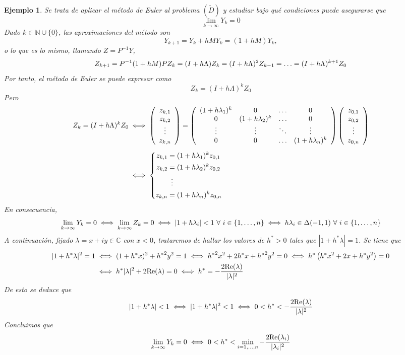 \documentclass[11pt]{report}
\theoremstyle{mytheorem}
\theoremstyle{mydefinition}
\theoremstyle{myexample}
\newtheorem*{example}{Ejemplo}
\newcommand{\N}{\mathbb N}
\newcommand{\C}{\mathbb C}
\begin{document}
\begin{example}
Se trata de aplicar el método de Euler al problema $(\widetilde{D})$ y estudiar bajo qué condiciones puede asegurarse que \[\lim_{k \to \infty} Y_k = 0\]
Dado $k \in \N \cup \{0\}$, las aproximaciones del método son
\[Y_{k+1} = Y_k+hMY_k = (1+hM)Y_k,\]
o lo que es lo mismo, llamando $Z=P^{-1}Y$,
\[Z_{k+1} = P^{-1}(1+hM)PZ_k = (I+h\Lambda)Z_k = (I+h\Lambda)^2Z_{k-1} = \mathellipsis = (I+h\Lambda)^{k+1}Z_0\]
Por tanto, el método de Euler se puede expresar como \[Z_k = (I+h\Lambda)^kZ_0\] Pero
\[
\begin{aligned}[t]
Z_k = (I+h\Lambda)^kZ_0 &\iff \left( \begin{array}{c}
z_{k,1} \\
z_{k,2} \\
\vdots \\
z_{k,n}
\end{array} \right) = \left( \begin{array}{cccc}
    (1+h\lambda_1)^k & 0 & \mathellipsis & 0 \\
    0 & (1+h\lambda_2)^k & \mathellipsis & 0 \\
    \vdots & \vdots & \ddots & \vdots \\
    0 & 0 & \mathellipsis & (1+h\lambda_n)^k
\end{array} \right) \left( \begin{array}{c}
z_{0,1} \\
z_{0,2} \\
\vdots \\
z_{0,n}
\end{array} \right) \\[5pt] &\iff \left\{ \begin{alignedat}{1}
    z_{k,1} &= (1+h\lambda_1)^kz_{0,1} \\
    z_{k,2} &= (1+h\lambda_2)^kz_{0,2} \\
    \mathrlap{\ \, \vdots} \\
    z_{k,n} &= (1+h\lambda_n)^kz_{0,n} \\
\end{alignedat} \right.
\end{aligned}
\]
En consecuencia,
\[\lim_{k \to \infty} Y_k = 0 \iff \lim_{k \to \infty} Z_k = 0 \iff |1+h\lambda_i|<1 \ \forall \ i \in \{1,\mathellipsis,n\} \iff h\lambda_i \in \Delta(-1,1) \ \forall \ i \in \{1,\mathellipsis,n\}\]
A continuación, fijado $\lambda =x+iy \in \C$ con $x<0$, trataremos de hallar los valores de $h^* >0$ tales que $|1+h^*\lambda| = 1$. Se tiene que
\[
\begin{aligned}[t]
|1+h^*\lambda|^2 = 1 &\iff (1+h^*x)^2+{h^*}^2y^2 = 1 \iff {h^*}^2x^2+2h^*x+{h^*}^2y^2 =0 \iff h^*\left(h^*x^2+2x+h^*y^2\right) =0 \\
&\iff h^*|\lambda|^2+2\textup{Re}(\lambda) = 0 \iff h^* = -\frac{2\textup{Re}(\lambda)}{|\lambda|^2}
\end{aligned}
\]
De esto se deduce que
\[|1+h^*\lambda| < 1 \iff |1+h^*\lambda|^2 < 1 \iff 0 < h^* < -\frac{2\textup{Re}(\lambda)}{|\lambda|^2}\]
Concluimos que
\[\lim_{k \to \infty} Y_k = 0 \iff 0 < h^* < \min_{i=1,\mathellipsis,n} -\frac{2\textup{Re}(\lambda_i)}{|\lambda_i|^2}\]
\end{example}
\end{document}
